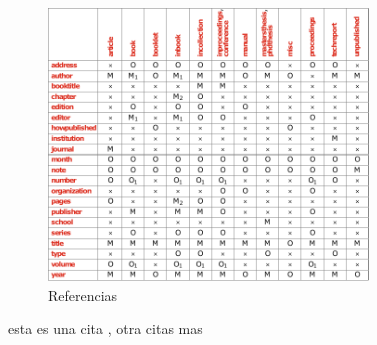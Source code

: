 \documentclass[11pt,letterpaper,twocolumn]{article}
\begin{document}
\begin{figure}[ht]
    \centering
    \includegraphics[width=8.5cm]{figuras/dibujo.pdf} 
    \caption{Referencias}
    \label{fig:logo}
\end{figure}
\lipsum[6] \par 
esta es una cita \citet{dhasaradhan2021hybrid}, otra citas mas \cite{bansal2021performance}\par 

\lipsum[7-8]




\end{document}
